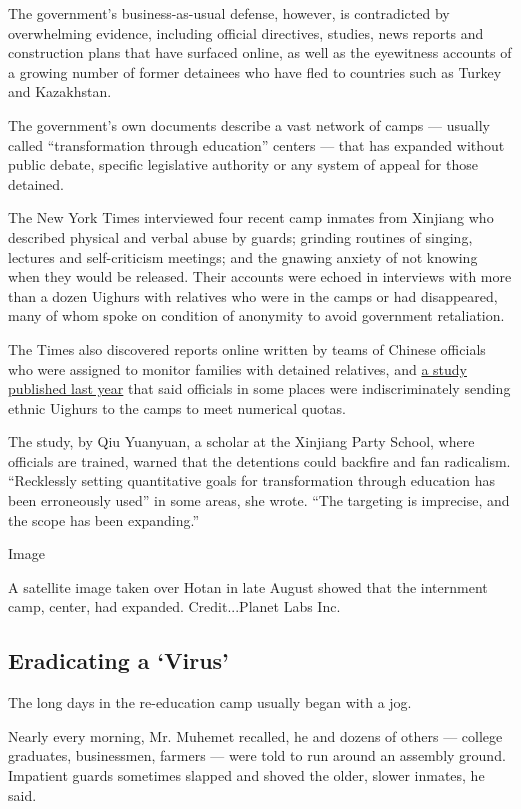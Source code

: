 The government's business-as-usual defense, however, is contradicted by
overwhelming evidence, including official directives, studies, news
reports and construction plans that have surfaced online, as well as the
eyewitness accounts of a growing number of former detainees who have
fled to countries such as Turkey and Kazakhstan.

The government's own documents describe a vast network of camps ---
usually called ``transformation through education'' centers --- that has
expanded without public debate, specific legislative authority or any
system of appeal for those detained.

The New York Times interviewed four recent camp inmates from Xinjiang
who described physical and verbal abuse by guards; grinding routines of
singing, lectures and self-criticism meetings; and the gnawing anxiety
of not knowing when they would be released. Their accounts were echoed
in interviews with more than a dozen Uighurs with relatives who were in
the camps or had disappeared, many of whom spoke on condition of
anonymity to avoid government retaliation.

The Times also discovered reports online written by teams of Chinese
officials who were assigned to monitor families with detained relatives,
and \href{http://www.zjdata.net/literature/detail/657545.html}{a study
published last year} that said officials in some places were
indiscriminately sending ethnic Uighurs to the camps to meet numerical
quotas.

The study, by Qiu Yuanyuan, a scholar at the Xinjiang Party School,
where officials are trained, warned that the detentions could backfire
and fan radicalism. ``Recklessly setting quantitative goals for
transformation through education has been erroneously used'' in some
areas, she wrote. ``The targeting is imprecise, and the scope has been
expanding.''

Image

A satellite image taken over Hotan in late August showed that the
internment camp, center, had expanded. Credit...Planet Labs Inc.

\hypertarget{eradicating-a-virus}{%
\subsection{Eradicating a `Virus'}\label{eradicating-a-virus}}

The long days in the re-education camp usually began with a jog.

Nearly every morning, Mr. Muhemet recalled, he and dozens of others ---
college graduates, businessmen, farmers --- were told to run around an
assembly ground. Impatient guards sometimes slapped and shoved the
older, slower inmates, he said.

